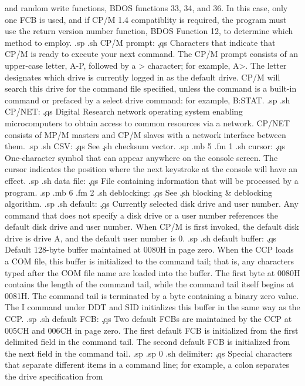 and random write functions, BDOS functions 33, 34, and 36.  In 
this case, only one FCB is used, and if CP/M 1.4 compatiblity is 
required, the program must use the return version number 
function, BDOS Function 12, to determine which method to employ.
.sp
.sh
CP/M prompt:  \c
.qs
Characters that indicate that CP/M is ready to execute your next 
command.  The CP/M prompt consists of an upper-case letter, A-P, 
followed by a > character; for example, A>.  The letter 
designates which drive is currently logged in as the default 
drive.  CP/M will search this drive for the command file 
specified, unless the command is a built-in command or prefaced 
by a select drive command: for example, B:STAT.
.sp
.sh
CP/NET:  \c
.qs
Digital Research network operating system enabling microcomputers 
to obtain access to common resources via a network.  CP/NET 
consists of MP/M masters and CP/M slaves with a network interface 
between them.
.sp
.sh
CSV:  \c
.qs
See \c
.sh
checksum vector.
.sp
.mb 5
.fm 1
.sh
cursor:  \c
.qs
One-character symbol that can appear anywhere on the console 
screen.  The cursor indicates the position where the next 
keystroke at the console will have an effect.
.sp
.sh
data file:  \c
.qs
File containing information that will be processed by a program.
.sp
.mb 6
.fm 2
.sh
deblocking:  \c
.qs
See \c
.sh
blocking & deblocking algorithm.
.sp
.sh
default:  \c
.qs
Currently selected disk drive and user number.  Any command that 
does not specify a disk drive or a user number references the 
default disk drive and user number.  When CP/M is first invoked, 
the default disk drive is drive A, and the default user number is 
0.
.sp
.sh
default buffer:  \c
.qs
Default 128-byte buffer maintained at 0080H in page zero.  When 
the CCP loads a COM file, this buffer is initialized to the 
command tail; that is, any characters typed after the COM file 
name are loaded into the buffer.  The first byte at 0080H 
contains the length of the command tail, while the command tail 
itself begins at 0081H.  The command tail is terminated by a byte 
containing a binary zero value.  The I command under DDT and SID 
initializes this buffer in the same way as the CCP.
.sp
.sh
default FCB:  \c
.qs
Two default FCBs are maintained by the CCP at 005CH and 006CH in 
page zero.  The first default FCB is initialized from the first 
delimited field in the command tail.  The second default FCB 
is initialized from the next field in the command tail.
.sp
.sp 0
.sh
delimiter:  \c
.qs
Special characters that separate different items in a command 
line; for example, a colon separates the drive specification from 

